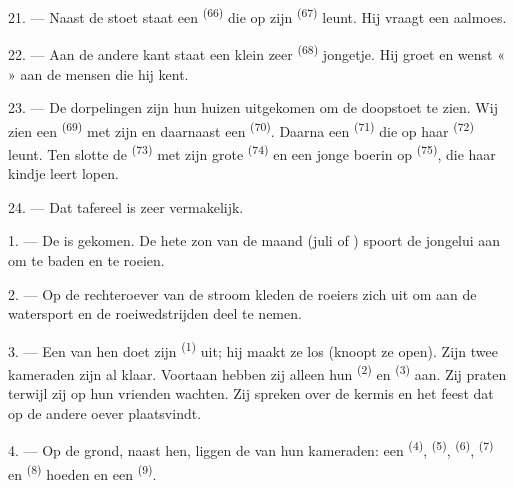 \VUsaut{4.6mm}
\VUsaut{3.4mm}

21. --- Naast de stoet staat een  \textsuperscript{(66)} die op zijn
 \textsuperscript{(67)} leunt. Hij vraagt een aalmoes.

22. --- Aan de andere kant staat een klein zeer  \textsuperscript{(68)}
jongetje. Hij groet en wenst «  » aan de mensen die hij kent.

23. --- De dorpelingen zijn hun huizen uitgekomen om de doopstoet te zien. Wij zien een
 \textsuperscript{(69)} met zijn  en daarnaast een
 \textsuperscript{(70)}. Daarna een  \textsuperscript{(71)}
die op haar  \textsuperscript{(72)} leunt. Ten slotte de 
\textsuperscript{(73)} met zijn grote
 \textsuperscript{(74)} en een jonge boerin op
 \textsuperscript{(75)}, die haar kindje leert lopen.

24. --- Dat tafereel is zeer vermakelijk.
\VUsaut{4.0mm}

\VUsaut{3.0mm}

\VUsaut{2.4mm}

\VUsaut{3.0mm}

1. --- De  is gekomen. De hete zon van de maand  (juli of
) spoort de jongelui aan om te baden en te roeien.

2. --- Op de rechteroever van de stroom kleden de roeiers zich uit om aan de watersport en de
roeiwedstrijden deel te nemen.

3. --- Een van hen doet zijn  \textsuperscript{(1)} uit; hij maakt ze los
(knoopt ze open). Zijn twee kameraden zijn al klaar. Voortaan hebben zij alleen hun
 \textsuperscript{(2)} en
 \textsuperscript{(3)} aan. Zij praten terwijl zij op hun
vrienden wachten. Zij spreken over de kermis en het feest dat op de andere oever plaatsvindt.

4. --- Op de grond, naast hen, liggen de  van hun kameraden: een
  \textsuperscript{(4)}, 
\textsuperscript{(5)},  \textsuperscript{(6)}, 
\textsuperscript{(7)} en  \textsuperscript{(8)} hoeden en een
 \textsuperscript{(9)}.

